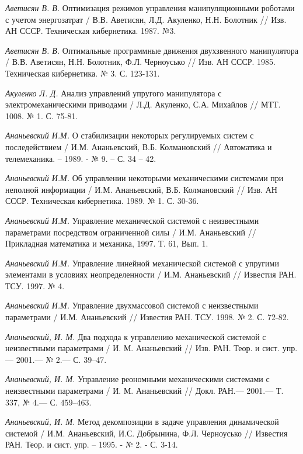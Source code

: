 \begin{thebibliography}{10} \label{bibl}
	
	{\it Аветисян В. В.} Оптимизация режимов управления манипуляционными роботами с учетом энергозатрат / В.В. Аветисян, Л.Д. Акуленко, Н.Н. Болотник // Изв. АН СССР. Техническая кибернетика. 1987. №3.
	
	{\it Аветисян В. В.} Оптимальные программные движения двухзвенного манипулятора / В.В. Аветисян, Н.Н. Болотник, Ф.Л. Черноусько // Изв. АН СССР. 1985. Техническая кибернетика. № 3. С. 123-131.
	
	{\it Акуленко Л. Д.} Анализ управлений упругого манипулятора с электромеханическими приводами / Л.Д. Акуленко, С.А. Михайлов // МТТ. 1008. № 1. С. 75-81.
	
	{\it Ананьевский И.М.} О стабилизации некоторых регулируемых систем с последействием / И.М. Ананьевский, В.Б. Колмановский // Автоматика и телемеханика. – 1989. - № 9. – С. 34 – 42.
	
	{\it Ананьевский И.М.} Об управлении некоторыми механическими системами при неполной информации / И.М. Ананьевский, В.Б. Колмановский // Изв. АН СССР. Техническая кибернетика. 1989. № 1. С. 30-36.

	{\it Ананьевский И.М.} Управление механической системой с неизвестными параметрами посредством ограниченной силы / И.М. Ананьевский // Прикладная математика и механика, 1997. Т. 61, Вып. 1.
	
	{\it Ананьевский И.М.} Управление линейной механической системой с упругими элементами в условиях неопределенности / И.М. Ананьевский // Известия РАН. ТСУ. 1997. № 4.

	{\it Ананьевский И.М.} Управление двухмассовой системой с неизвестными параметрами / И.М. Ананьевский // Известия РАН. ТСУ. 1998. № 2. С. 72-82.

	{\it Ананьевский, И. М.} Два подхода к управлению механической системой с неизвестными параметрами /
	И. М. Ананьевский // Изв. РАН. Теор. и сист. упр.— 2001.— № 2.— С. 39–47.
	
	{\it Ананьевский, И. М.} Управление реономными механическими системами с неизвестными параметрами /
	И. М. Ананьевский // Докл. РАН.— 2001.— Т. 337, № 4.— С. 459–463.
	
	{\it Ананьевский, И. М.} Метод декомпозиции в задаче управления динамической системой / И.М. Ананьевский, И.С. Добрынина, Ф.Л. Черноусько // Известия РАН. Теор. и сист. упр. -- 1995. - № 2. - С. 3-14.
	

\end{thebibliography}
